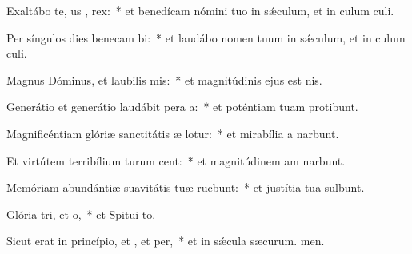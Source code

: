 \item Exaltábo te, us , rex:~* et benedícam nómini tuo in sǽculum, et in culum culi.
\item Per síngulos dies benecam bi:~* et laudábo nomen tuum in sǽculum, et in culum culi.
\item Magnus Dóminus, et laubilis mis:~* et magnitúdinis ejus  est nis.
\item Generátio et generátio laudábit pera a:~* et poténtiam tuam protibunt.
\item Magnificéntiam glóriæ sanctitátis æ lotur:~* et mirabília a narbunt.
\item Et virtútem terribílium turum cent:~* et magnitúdinem am narbunt.
\item Memóriam abundántiæ suavitátis tuæ rucbunt:~* et justítia tua sulbunt.
\item Glória tri, et o,~* et Spitui to.
\item Sicut erat in princípio, et , et per,~* et in sǽcula sæcurum. men.

